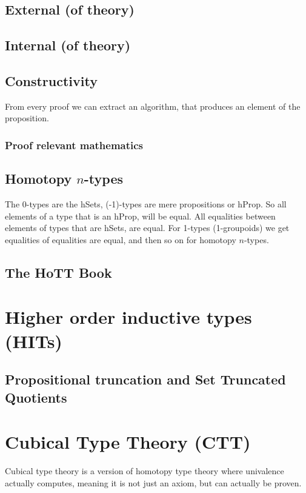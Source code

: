\documentclass[twoside,11pt,openright]{report}
\theoremstyle{plain} %
\theoremstyle{definition}
\theoremstyle{remark}
\begin{document}
\subsection{External (of theory)}
\subsection{Internal (of theory)}

\subsection{Constructivity}
From every proof we can extract an algorithm, that produces an element of the proposition.

\subsubsection{Proof relevant mathematics}

\subsection{Homotopy \(n\)-types}
The 0-types are the hSets, (-1)-types are mere propositions or hProp. So all elements of a type that is an hProp, will be equal. All equalities between elements of types that are hSets, are equal. For 1-types (1-groupoids) we get equalities of equalities are equal, and then so on for homotopy \(n\)-types.

\subsection{The HoTT Book}

\section{Higher order inductive types (HITs)}
\subsection{Propositional truncation and Set Truncated Quotients}

\section{Cubical Type Theory (CTT)}
Cubical type theory is a version of homotopy type theory where univalence actually computes, meaning it is not just an axiom, but can actually be proven. \cite{nlab:cubical_type_theory}
\end{document}
